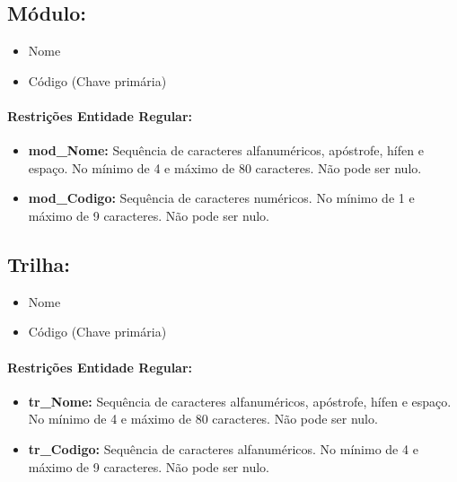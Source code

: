 \documentclass{report}
\begin{document}
\subsection{Módulo:}
\begin{itemize}
  \item Nome
  \item Código (Chave primária)
\end{itemize}
\paragraph{Restrições Entidade Regular:}
\begin{itemize}
  \item \textbf{mod\_Nome:} Sequência de caracteres alfanuméricos, apóstrofe, hífen e espaço. No mínimo de 4 e máximo de 80 caracteres. Não pode ser nulo.
  \item \textbf{mod\_Codigo:} Sequência de caracteres numéricos. No mínimo de 1 e máximo de 9 caracteres. Não pode ser nulo.
\end{itemize}


\subsection{Trilha:}
\begin{itemize}
  \item Nome
  \item Código (Chave primária)
\end{itemize}
\paragraph{Restrições Entidade Regular:}
\begin{itemize}
  \item \textbf{tr\_Nome:} Sequência de caracteres alfanuméricos, apóstrofe, hífen e espaço. No mínimo de 4 e máximo de 80 caracteres. Não pode ser nulo.
  \item \textbf{tr\_Codigo:} Sequência de caracteres alfanuméricos. No mínimo de 4 e máximo de 9 caracteres. Não pode ser nulo.
\end{itemize}
\end{document}
